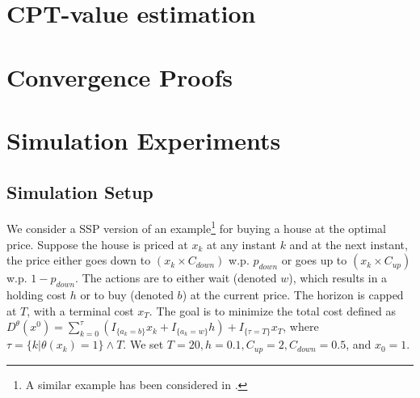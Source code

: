 \documentclass[11pt,letterpaper,english]{article}
\begin{document}
\section{CPT-value estimation} 
\label{sec:cpt-sampling}





\section{Convergence Proofs}
\label{sec:convergence}

\section{Simulation Experiments}
\label{sec:expts}

\subsection{Simulation Setup}  
We consider a SSP version of an example\footnote{A similar example has been considered in \cite{chow2014algorithms}.} for buying a house at the optimal price. Suppose the house is priced at $x_k$ at any instant $k$ and at the next instant, the price either goes down to $\left(x_k \times C_{down}\right)$ w.p. $p_{down}$ or goes up to $\left(x_k\times C_{up}\right)$ w.p. $1-p_{down}$. The actions are to either wait (denoted $w$), which results in a holding cost $h$ or to buy (denoted $b$) at the current price. The horizon is capped at $T$, with a terminal cost $x_T$.  The goal is to minimize the total cost defined as $ 
D^{\theta}(x^0)= \sum_{k=0}^\tau \left(I_{\{a_k =b \} }x_k+I_{\{a_k =w \} } h\right) + I_{\{\tau=T\}} x_T$, where $\tau =  \{k | \theta(x_k)=1 \} \wedge T$.
We set $T=20, h=0.1, C_{up}=2, C_{down}=0.5$, and $x_0=1$.  
\end{document}
